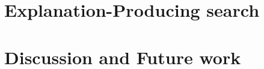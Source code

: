 \documentclass{llncs}
\begin{document}
\section{Explanation-Producing search}\label{sec:explanation}

\section{Discussion and Future work}\label{sec:experiments}

% 
%
%

{\small

    
}
\end{document}
